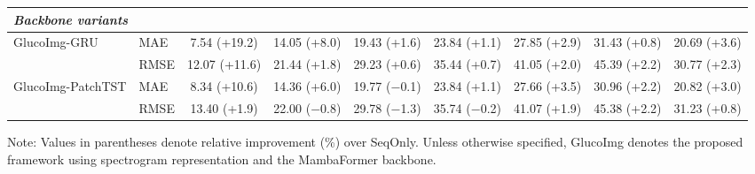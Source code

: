 \begin{table}[t]
{\begin{tabular}{llccccccc}
\midrule
\multicolumn{9}{l}{\textit{Backbone variants}} \\
\midrule

\multirow{2}{*}{GlucoImg-GRU}
& MAE
& 7.54 {\scriptsize (+19.2)}
& 14.05 {\scriptsize (+8.0)}
& 19.43 {\scriptsize (+1.6)}
& 23.84 {\scriptsize (+1.1)}
& 27.85 {\scriptsize (+2.9)}
& 31.43 {\scriptsize (+0.8)}
& 20.69 {\scriptsize (+3.6)} \\
& RMSE
& 12.07 {\scriptsize (+11.6)}
& 21.44 {\scriptsize (+1.8)}
& 29.23 {\scriptsize (+0.6)}
& 35.44 {\scriptsize (+0.7)}
& 41.05 {\scriptsize (+2.0)}
& 45.39 {\scriptsize (+2.2)}
& 30.77 {\scriptsize (+2.3)} \\

\multirow{2}{*}{GlucoImg-PatchTST}
& MAE
& 8.34 {\scriptsize (+10.6)}
& 14.36 {\scriptsize (+6.0)}
& 19.77 {\scriptsize ($-$0.1)}
& 23.84 {\scriptsize (+1.1)}
& 27.66 {\scriptsize (+3.5)}
& 30.96 {\scriptsize (+2.2)}
& 20.82 {\scriptsize (+3.0)} \\
& RMSE
& 13.40 {\scriptsize (+1.9)}
& 22.00 {\scriptsize ($-$0.8)}
& 29.78 {\scriptsize ($-$1.3)}
& 35.74 {\scriptsize ($-$0.2)}
& 41.07 {\scriptsize (+1.9)}
& 45.38 {\scriptsize (+2.2)}
& 31.23 {\scriptsize (+0.8)} \\

\bottomrule
\end{tabular}
}

\vspace{1mm}
\footnotesize{
Note: Values in parentheses denote relative improvement (\%) over SeqOnly.
Unless otherwise specified, GlucoImg denotes the proposed framework using spectrogram representation and the MambaFormer backbone.
}
\end{table}

